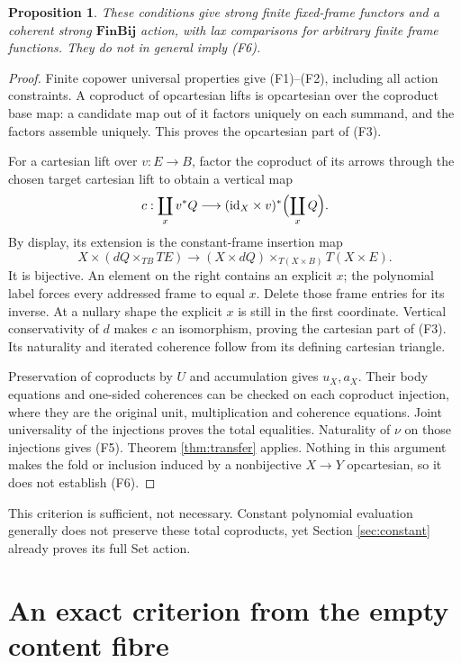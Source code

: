 \documentclass[11pt,a4paper]{article}
\newtheorem{proposition}[theorem]{Proposition}
\theoremstyle{definition}
\newcommand{\FinBij}{\mathbf{FinBij}}
\newcommand{\id}{\mathrm{id}}
\begin{document}
\begin{proposition}\label{prop:copower}
These conditions give strong finite fixed-frame functors and a coherent
strong $\FinBij$ action, with lax comparisons for arbitrary finite frame
functions. They do not in general imply \textup{(F6)}.
\end{proposition}
\begin{proof}
Finite copower universal properties give (F1)--(F2), including all action
constraints. A coproduct of opcartesian lifts is opcartesian over the
coproduct base map: a candidate map out of it factors uniquely on each
summand, and the factors assemble uniquely. This proves the opcartesian
part of (F3).

For a cartesian lift over $v:E\to B$, factor the coproduct of its arrows
through the chosen target cartesian lift to obtain a vertical map
\[
 c:\coprod_x v^*Q\longrightarrow
            (\id_X\times v)^*\Bigl(\coprod_xQ\Bigr).
\]
By display, its extension is the constant-frame insertion map
\[
 X\times(dQ\times_{TB}TE)
 \longrightarrow (X\times dQ)\times_{T(X\times B)}T(X\times E).
\]
It is bijective. An element on the right contains an explicit $x$; the
polynomial label forces every addressed frame to equal $x$. Delete those
frame entries for its inverse. At a nullary shape the explicit $x$ is still
in the first coordinate. Vertical conservativity of $d$ makes $c$ an
isomorphism, proving the cartesian part of (F3). Its naturality and iterated
coherence follow from its defining cartesian triangle.

Preservation of coproducts by $U$ and accumulation gives $u_X,a_X$.
Their body equations and one-sided coherences can be checked on each
coproduct injection, where they are the original unit, multiplication and
coherence equations. Joint universality of the injections proves the total
equalities. Naturality of $\nu$ on those injections gives (F5). Theorem
\ref{thm:transfer} applies. Nothing in this argument makes the fold or
inclusion induced by a nonbijective $X\to Y$ opcartesian, so it does not
establish (F6).
\end{proof}
This criterion is sufficient, not necessary. Constant polynomial evaluation
generally does not preserve these total coproducts, yet Section
\ref{sec:constant} already proves its full Set action.

\section{An exact criterion from the empty content fibre}\label{sec:exact}
\end{document}
